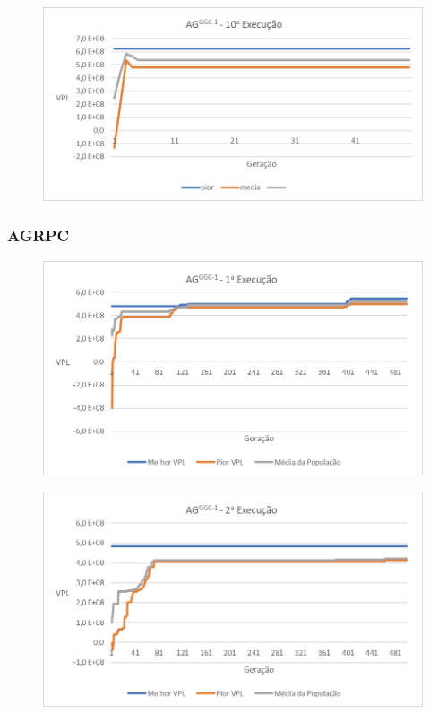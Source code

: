 \documentclass[12pt,a4paper]{report}
\begin{document}
\begin{figure}[H]
\centering

\includegraphics[scale=1]{ApA/GCC/10}
\end{figure}

\subsubsection{AGRPC}

\begin{figure}[H]
\centering

\includegraphics[scale=1]{ApA/AGRPC/1}
\end{figure}

\begin{figure}[H]
\centering

\includegraphics[scale=1]{ApA/AGRPC/2}
\end{figure}
\end{document}
